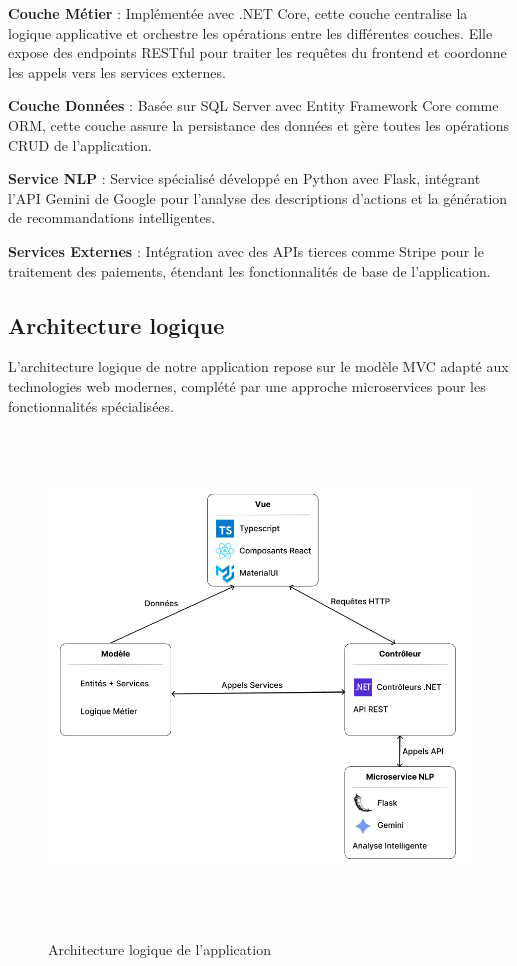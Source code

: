 \noindent \textbf{Couche Métier} : Implémentée avec .NET Core, cette couche centralise la logique applicative et orchestre les opérations entre les différentes couches. Elle expose des endpoints RESTful pour traiter les requêtes du frontend et coordonne les appels vers les services externes.

\noindent \textbf{Couche Données} : Basée sur SQL Server avec Entity Framework Core comme ORM, cette couche assure la persistance des données et gère toutes les opérations CRUD de l'application.

\noindent \textbf{Service NLP} : Service spécialisé développé en Python avec Flask, intégrant l'API Gemini de Google pour l'analyse des descriptions d'actions et la génération de recommandations intelligentes.

\noindent \textbf{Services Externes} : Intégration avec des APIs tierces comme Stripe pour le traitement des paiements, étendant les fonctionnalités de base de l'application.

\subsection{Architecture logique}

\noindent L'architecture logique de notre application repose sur le modèle MVC adapté aux technologies web modernes, complété par une approche microservices pour les fonctionnalités spécialisées.



\begin{figure}[H]
    \centering
    \includegraphics[width=15cm, height=13cm]{images/Architecturelogique.PNG}
    \label{fig:arch_logique}
    \caption{Architecture logique de l'application}
\end{figure}


